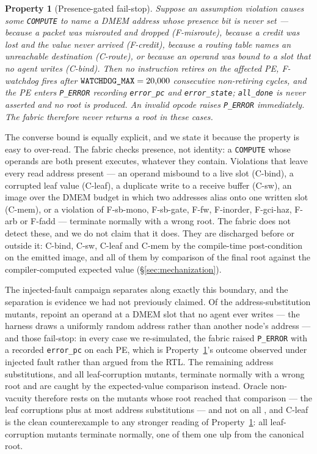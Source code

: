 \documentclass[journal,10pt]{IEEEtran}
\theoremstyle{plain}
\newtheorem{property}{Property}
\theoremstyle{definition}
\theoremstyle{remark}
\newcommand{\sv}[1]{\texttt{#1}}
\begin{document}
\begin{property}[Presence-gated fail-stop]\label{prop:2}
Suppose an assumption violation causes some \texttt{COMPUTE} to name a DMEM
address whose presence bit is never set --- because a packet was misrouted
and dropped (\textsf{F-misroute}), because a credit was lost and the value
never arrived (\textsf{F-credit}), because a routing table names an
unreachable destination (\textsf{C-route}), or because an operand was bound
to a slot that no agent writes (\textsf{C-bind}). Then no instruction
retires on the affected PE, \textsf{F-watchdog} fires after
$\sv{WATCHDOG\_MAX} = \WatchdogMax$ consecutive non-retiring cycles, and
the PE enters \texttt{P\_ERROR} recording \sv{error\_pc} and
\sv{error\_state}; \sv{all\_done} is never asserted and no root is
produced. An invalid opcode raises \texttt{P\_ERROR} immediately. The
fabric therefore never returns a root in these cases.
\end{property}

The converse bound is equally explicit, and we state it because the
property is easy to over-read. The fabric checks presence, not identity: a
\texttt{COMPUTE} whose operands are both present executes, whatever they
contain. Violations that leave every read address present --- an operand
misbound to a live slot (\textsf{C-bind}), a corrupted leaf value
(\textsf{C-leaf}), a duplicate write to a receive buffer (\textsf{C-sw}),
an image over the DMEM budget in which two addresses alias onto one written
slot (\textsf{C-mem}), or a violation of \textsf{F-sb-mono},
\textsf{F-sb-gate}, \textsf{F-fw}, \textsf{F-inorder}, \textsf{F-gci-haz},
\textsf{F-arb} or \textsf{F-fadd} --- terminate normally with a wrong root.
The fabric does not detect these, and we do not claim that it does. They
are discharged before or outside it: \textsf{C-bind}, \textsf{C-sw},
\textsf{C-leaf} and \textsf{C-mem} by the compile-time post-condition on
the emitted image, and all of them by comparison of the final root against
the compiler-computed expected value (\S\ref{sec:mechanization}).

The injected-fault campaign separates along exactly this boundary, and the
separation is evidence we had not previously claimed. Of the \MutAddrSub{}
address-substitution mutants, \MutAddrStall{} repoint an operand at a DMEM
slot that no agent ever writes --- the harness draws a uniformly random
address rather than another node's address --- and those fail-stop: in
every case we re-simulated, the fabric raised \texttt{P\_ERROR} with a
recorded \sv{error\_pc} on each PE, which is Property~\ref{prop:2}'s
outcome observed under injected fault rather than argued from the RTL. The
remaining address substitutions, and all \MutLeaf{} leaf-corruption
mutants, terminate normally with a wrong root and are caught by the
expected-value comparison instead. Oracle non-vacuity therefore rests on
the mutants whose root reached that comparison --- the \MutLeaf{} leaf
corruptions plus at most \MutLiveSlotMax{} address substitutions --- and
not on all \MutTotal{}, and \textsf{C-leaf} is the clean counterexample to
any stronger reading of Property~\ref{prop:2}: all \MutLeaf{}
leaf-corruption mutants terminate normally, one of them one ulp from the
canonical root.
\end{document}

